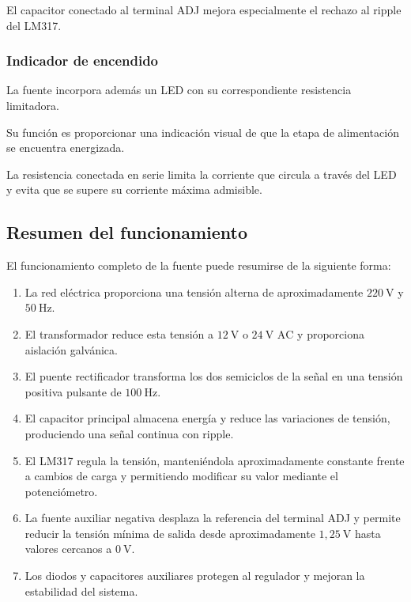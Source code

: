 \documentclass[12pt,a4paper]{article}
\begin{document}
	El capacitor conectado al terminal ADJ mejora especialmente el rechazo al ripple
	del LM317.
	
	\subsubsection{Indicador de encendido}
	
	La fuente incorpora además un LED con su correspondiente resistencia limitadora.
	
	Su función es proporcionar una indicación visual de que la etapa de alimentación
	se encuentra energizada.
	
	La resistencia conectada en serie limita la corriente que circula a través del
	LED y evita que se supere su corriente máxima admisible.
	
	\subsection{Resumen del funcionamiento}
	
	El funcionamiento completo de la fuente puede resumirse de la siguiente forma:
	
	\begin{enumerate}
		
		\item La red eléctrica proporciona una tensión alterna de aproximadamente
		$220~\text{V}$ y $50~\text{Hz}$.
		
		\item El transformador reduce esta tensión a $12~\text{V}$ o
		$24~\text{V AC}$ y proporciona aislación galvánica.
		
		\item El puente rectificador transforma los dos semiciclos de la señal en
		una tensión positiva pulsante de $100~\text{Hz}$.
		
		\item El capacitor principal almacena energía y reduce las variaciones de
		tensión, produciendo una señal continua con ripple.
		
		\item El LM317 regula la tensión, manteniéndola aproximadamente constante
		frente a cambios de carga y permitiendo modificar su valor mediante el
		potenciómetro.
		
		\item La fuente auxiliar negativa desplaza la referencia del terminal ADJ
		y permite reducir la tensión mínima de salida desde aproximadamente
		$1,25~\text{V}$ hasta valores cercanos a $0~\text{V}$.
		
		\item Los diodos y capacitores auxiliares protegen al regulador y mejoran
		la estabilidad del sistema.
		
	\end{enumerate}
	
\end{document}
